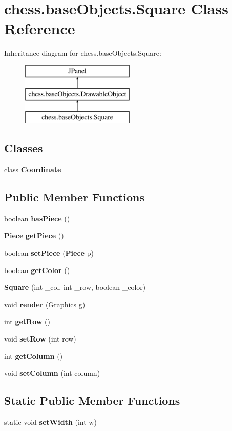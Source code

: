 \section{chess.\+base\+Objects.\+Square Class Reference}
\label{classchess_1_1base_objects_1_1_square}
Inheritance diagram for chess.\+base\+Objects.\+Square\+:\begin{figure}[H]
\begin{center}
\leavevmode
\includegraphics[height=3.000000cm]{classchess_1_1base_objects_1_1_square}
\end{center}
\end{figure}
\subsection*{Classes}
\begin{DoxyCompactItemize}
\item 
class {\bfseries Coordinate}
\end{DoxyCompactItemize}
\subsection*{Public Member Functions}
\begin{DoxyCompactItemize}
\item 
boolean {\bf has\+Piece} ()
\item 
{\bf Piece} {\bf get\+Piece} ()
\item 
boolean {\bf set\+Piece} ({\bf Piece} p)
\item 
boolean {\bf get\+Color} ()
\item 
{\bf Square} (int \+\_\+col, int \+\_\+row, boolean \+\_\+color)
\item 
void {\bf render} (Graphics g)
\item 
int {\bf get\+Row} ()
\item 
void {\bf set\+Row} (int row)
\item 
int {\bf get\+Column} ()
\item 
void {\bf set\+Column} (int column)
\end{DoxyCompactItemize}
\subsection*{Static Public Member Functions}
\begin{DoxyCompactItemize}
\item 
static void {\bf set\+Width} (int w)
\end{DoxyCompactItemize}


